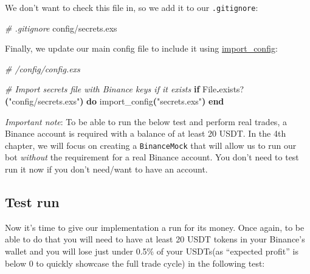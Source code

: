 \documentclass[
  oneside]{book}
\newenvironment{Shaded}{\begin{snugshade}}{\end{snugshade}}
\newcommand{\CommentTok}[1]{\textcolor[rgb]{0.56,0.35,0.01}{\textit{#1}}}
\newcommand{\ConstantTok}[1]{\textcolor[rgb]{0.56,0.35,0.01}{#1}}
\newcommand{\ControlFlowTok}[1]{\textcolor[rgb]{0.13,0.29,0.53}{\textbf{#1}}}
\newcommand{\ExtensionTok}[1]{#1}
\newcommand{\FunctionTok}[1]{\textcolor[rgb]{0.13,0.29,0.53}{\textbf{#1}}}
\newcommand{\KeywordTok}[1]{\textcolor[rgb]{0.13,0.29,0.53}{\textbf{#1}}}
\newcommand{\NormalTok}[1]{#1}
\newcommand{\OperatorTok}[1]{\textcolor[rgb]{0.81,0.36,0.00}{\textbf{#1}}}
\newcommand{\StringTok}[1]{\textcolor[rgb]{0.31,0.60,0.02}{#1}}
\begin{document}
We don't want to check this file in, so we add it to our \texttt{.gitignore}:

\begin{Shaded}
\begin{Highlighting}[]
\CommentTok{\# .gitignore}
\ExtensionTok{config/secrets.exs}
\end{Highlighting}
\end{Shaded}

Finally, we update our main config file to include it using \href{https://hexdocs.pm/elixir/master/Config.html\#import_config/1}{import\_config}:

\begin{Shaded}
\begin{Highlighting}[]
\CommentTok{\# /config/config.exs}

\CommentTok{\# Import secrets file with Binance keys if it exists}
\ControlFlowTok{if} \ConstantTok{File}\OperatorTok{.}\NormalTok{exists?}\FunctionTok{(}\StringTok{"config/secrets.exs"}\FunctionTok{)} \KeywordTok{do}
\NormalTok{  import\_config}\FunctionTok{(}\StringTok{"secrets.exs"}\FunctionTok{)}
\KeywordTok{end}
\end{Highlighting}
\end{Shaded}

\emph{Important note}: To be able to run the below test and perform real trades, a Binance account is required with a balance of at least 20 USDT. In the 4th chapter, we will focus on creating a \texttt{BinanceMock} that will allow us to run our bot \emph{without} the requirement for a real Binance account. You don't need to test run it now if you don't need/want to have an account.

\subsection{Test run}\label{test-run}

Now it's time to give our implementation a run for its money. Once again, to be able to do that you will need to have at least 20 USDT tokens in your Binance's wallet and you will lose just under 0.5\% of your USDTs(as ``expected profit'' is below 0 to quickly showcase the full trade cycle) in the following test:
\end{document}
